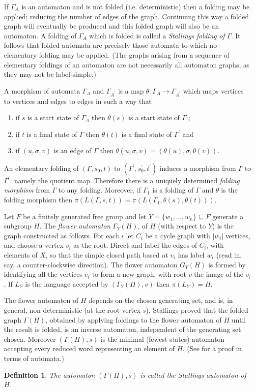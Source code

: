 \documentclass[a4paper,12pt]{article}
\newcommand{\G}{\Gamma }
\newtheorem{definition}[theorem]{Definition}
\numberwithin{equation}{section}
\numberwithin{figure}{section}
\newcommand{\maps}{\rightarrow}
\newcommand{\be}{\begin{enumerate}}
\newcommand{\ee}{\end{enumerate}}
\begin{document}
If $\G_A$ is an automaton and  is not folded (i.e. deterministic) 
then a folding may be applied; reducing the
number of edges of the graph. Continuing this way a folded graph will eventually
be produced and this folded graph will also be an automaton. 
A folding of $\G_A$ which is folded is called a \emph{Stallings folding of}
$\G$.
It follows that  folded  automata are precisely those
automata to which no elementary folding may be applied. (The graphs arising
from a sequence of elementary foldings of an automaton are not necessarily
all automaton graphs, as they may not 
be label-simple.)  

A morphism of automata $\G_A$ and $\G_{A^\prime}$ is a map
$\theta: \G_A\maps \G_{A^\prime}$ which maps vertices to vertices and
edges to edges in such a way that
\be \item if $s$ is a start state  of
$\G_A$ then $\theta(s)$ is a start state of $\G^\prime$;
\item if $t$ is a final state of $\G$ then $\theta(t)$ is a final state of
$\G^\prime$ and
\item  if
$(u,\sigma,v)$ is an edge of $\G$ then
$\theta(u,\sigma,v)=(\theta(u),\sigma,\theta(v))$. \ee An
elementary folding of  $(\G,s_0,t)$ to $(\G^\prime,s^\prime_0,
t^\prime)$ induces a morphism from $\G$ to $\G^\prime$: namely the
quotient map. Therefore there is
 a uniquely determined {\em folding morphism}  from $\G$ to any folding. Moreover, if $\G_1$
is a folding of $\G$ and $\theta$ is the folding morphism then
$\pi(L(\G,s,t))= \pi(L(\G_1,\theta(s),\theta(t)))$.




Let $F$ be a finitely generated free group and let 
$Y=\{w_1,\ldots ,w_n\}\subseteq F$ generate a subgroup $H$. 
The {\em flower automaton} $\G_Y(H)$, of $H$ (with respect to $Y$)
is the graph constructed as follows. For each $i$ let $C_i$ be a cycle
graph with $|w_i|$ vertices, and choose a vertex $v_i$ as the root. Direct
and label the edges of $C_i$, with elements of $X$,
so that the simple closed path based at $v_i$ has
label $w_i$ (read in, say, a counter-clockwise direction). The flower
automaton $G_Y(H)$ is formed by identifying all the vertices $v_i$ to form
a new graph, with root $v$ the image of the $v_i$. If $L_Y$ is the language  accepted
by $(\G_Y(H), v)$ then $\pi(L_Y)=H$.


The flower automaton of $H$ depends on the chosen generating set, and is,
in general,
non-deterministic (at the root vertex $s$). Stallings \cite{stallings83}
proved that the folded graph $\G(H)$, obtained by applying foldings to the
flower automaton of $H$ until the result is folded, is an inverse
automaton, independent of the generating set chosen.
Moreover  $(\G(H),s)$ is the minimal (fewest states) automaton accepting
every reduced word representing an element of $H$. (See \cite{BartholdiSilva}
for a proof in terms of automata.)
\begin{definition}
The automaton $(\G(H),s)$ is  called the {\em Stallings automaton} of $H$.
\end{definition}
\end{document}
